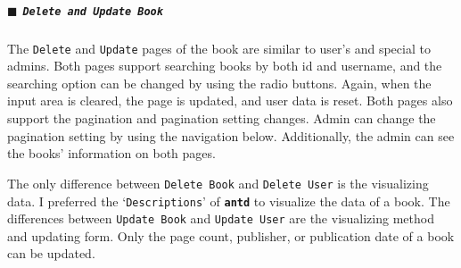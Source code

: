 \subparagraph{\texorpdfstring{$\blacksquare$}{-} \texttt{Delete and Update Book}}

The \texttt{Delete} and \texttt{Update} pages of the book are similar to user's and special to admins. Both pages support searching books by both id and username, and the searching option can be changed by using the radio buttons. Again, when the input area is cleared, the page is updated, and user data is reset. Both pages also support the pagination and pagination setting changes. Admin can change the pagination setting by using the navigation below. Additionally, the admin can see the books' information on both pages.

The only difference between \texttt{Delete Book} and \texttt{Delete User} is the visualizing data. I preferred the `\texttt{Descriptions}' of \textbf{\texttt{antd}} to visualize the data of a book. The differences between \texttt{Update Book} and \texttt{Update User} are the visualizing method and updating form. Only the page count, publisher, or publication date of a book can be updated.

